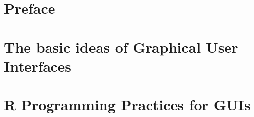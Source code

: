 \documentclass[showtrims]{memoir}
\begin{document}
\thispagestyle{empty}


\frontmatter

\chapter*{Preface}
\label{chap:preface}





\setcounter{tocdepth}{3}
\tableofcontents
\newpage



\graphicspath{
  {ch-Preface/}
  {ch-GUIBasics/}
  {ch-ProgrammingPractices/}
  {ch-gWidgets/}
  {ch-RGtk2/}
  {ch-RwxWidgets/}
  {ch-tcltk/}
  {ch-WebGUIs/}
}


\mainmatter
\chapter{The basic ideas of Graphical User Interfaces}
\label{chap:GUIBasics}




\chapter{R Programming Practices for GUIs}
\label{chap:programming-practices}
%



\label{chap:gWidgets-intro}



\label{chap:RGtk2}



% 
\end{document}
